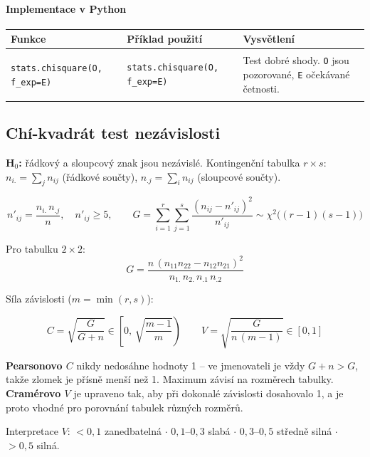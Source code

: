 \documentclass[a4paper, 11pt]{article}
\newenvironment{funkcedict}
{%
  \begingroup
  \renewcommand{\arraystretch}{1.4}%
  \lstset{basicstyle=\ttfamily\small, columns=fullflexible}%
  \setlength{\tabcolsep}{4pt}%
  \begin{tabular}{p{0.19\textwidth} p{0.38\textwidth} p{0.30\textwidth}}
  \textbf{Funkce} & \textbf{Příklad použití} & \textbf{Vysvětlení} \\
  \midrule
}
{%
  \end{tabular}%
  \endgroup
}
\begin{document}
\paragraph{Implementace v Python}\mbox{}\par

\begin{funkcedict}

	\texttt{stats.chisquare(O, f\_exp=E)} &
	\begin{lstlisting}
stats.chisquare(O, f_exp=E)
	\end{lstlisting}
	& Test dobré shody. \texttt{O} jsou pozorované, \texttt{E} očekávané četnosti. \\

\end{funkcedict}

\subsection{Chí-kvadrát test nezávislosti}

\textbf{H$_0$:} řádkový a sloupcový znak jsou nezávislé.
Kontingenční tabulka $r \times s$: $n_{i.} = \sum_{j}n_{ij}$ (řádkové součty), $n_{.j} = \sum_{i}n_{ij}$ (sloupcové součty).

\begin{equation*}
	n'_{ij} = \frac{n_{i.}\, n_{.j}}{n},\quad n'_{ij} \ge 5, \qquad
	G = \sum_{i=1}^{r}\sum_{j=1}^{s} \frac{(n_{ij} - n'_{ij})^2}{n'_{ij}} \sim \chi^2\bigl((r-1)(s-1)\bigr)
\end{equation*}

Pro tabulku $2 \times 2$:
\begin{equation*}
	G = \frac{n\,(n_{11}n_{22} - n_{12}n_{21})^2}{n_{1.}\, n_{2.}\, n_{.1}\, n_{.2}}
\end{equation*}

Síla závislosti ($m = \min(r,s)$):

\begin{equation*}
	C = \sqrt{\frac{G}{G + n}} \in \left[0,\, \sqrt{\frac{m-1}{m}}\right)
	\qquad
	V = \sqrt{\frac{G}{n\,(m-1)}} \in [0, 1]
\end{equation*}

\noindent\textbf{Pearsonovo $C$} nikdy nedosáhne hodnoty 1 -- ve jmenovateli je vždy $G+n > G$,
takže zlomek je přísně menší než 1. Maximum závisí na rozměrech tabulky.
\textbf{Cramérovo $V$} je upraveno tak, aby při dokonalé závislosti dosahovalo 1, a je proto vhodné pro porovnání tabulek různých rozměrů.

Interpretace $V$: $< 0{,}1$ zanedbatelná $\cdot$ $0{,}1$--$0{,}3$ slabá $\cdot$ $0{,}3$--$0{,}5$ středně silná $\cdot$ $> 0{,}5$ silná.
\end{document}
